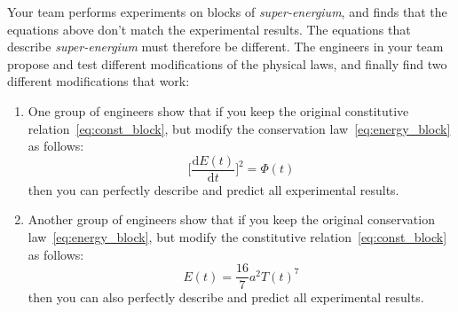 \documentclass[a4paper,12pt,%
onecolumn,oneside,%
british%
]{memoir}
\newcommand*{\di}{\mathrm{d}}%
\renewcommand*{\|}[1][]{\nonscript\:#1\vert\nonscript\:\mathopen{}}
\newcommand*{\yE}{E}
\newcommand*{\yH}{\varPhi}%
\newcommand*{\yT}{T}%
\begin{document}
Your team performs experiments on blocks of \emph{super-energium}, and finds that the equations above don't match the experimental results. The equations that describe \emph{super-energium} must therefore be different. The engineers in your team propose and test different modifications of the physical laws, and finally find two different modifications that work:
%
%
\begin{enumerate}[label=(\Alph*)]
\item\label{item:team_A} One group of engineers show that if you keep the original constitutive relation~\eqref{eq:const_block}, but modify the conservation law~\eqref{eq:energy_block} as follows:
  \begin{equation}
    \label{eq:energy_block_new}
    \biggl[\frac{\di\yE(t)}{\di t}\biggr]^{2} = \yH(t)
  \end{equation}
then you can perfectly describe and predict all experimental results.

\item\label{item:team_B} Another group of engineers show that if you keep the original conservation law~\eqref{eq:energy_block}, but modify the constitutive relation~\eqref{eq:const_block} as follows:
  \begin{equation}
    \label{eq:const_block_new}
    \yE(t) = \frac{16}{7} a^{2} \yT(t)^{7}
  \end{equation}
  then you can also perfectly describe and predict all experimental results.
\end{enumerate}
\end{document}
